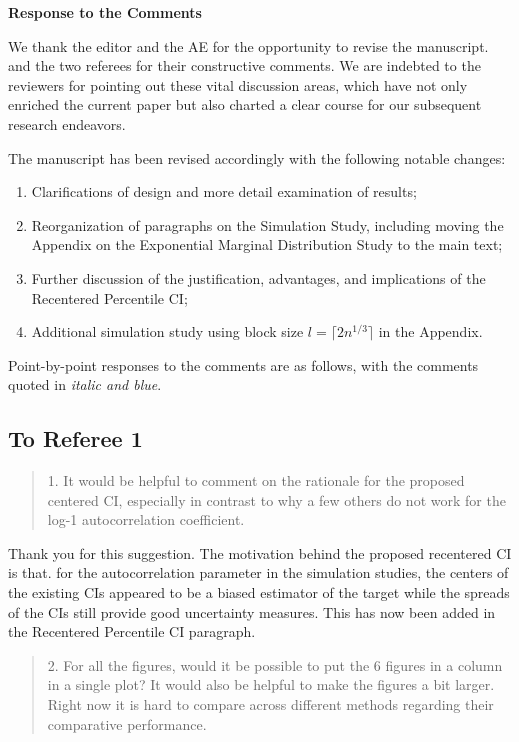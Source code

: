 \documentclass[12pt]{article}
\newenvironment{comment}%
{\begin{quotation}\noindent\small\it\color{darkblue}\ignorespaces%
}{\end{quotation}}
\begin{document}
\begin{center}
  {\Large\bf Response to the Comments}
\end{center}



We thank the editor and the AE for the opportunity to revise the manuscript. and
the two referees for their constructive comments.
We are indebted to the reviewers for pointing out these vital discussion areas,
which have not only enriched the current paper but also charted a clear course
for our subsequent research endeavors.

The manuscript has been
revised accordingly with the following notable changes:
\begin{enumerate}
\item Clarifications of design and more detail examination of results;
\item Reorganization of paragraphs on the Simulation Study, including moving the
Appendix on the Exponential Marginal Distribution Study to the main text;
\item Further discussion of the justification, advantages, and implications of
the Recentered Percentile CI;
\item Additional simulation study using block size 
$l = \lceil 2n^{1/3} \rceil$ in the Appendix.
\end{enumerate}


Point-by-point responses to the comments are as follows, with the
comments quoted in \emph{\color{darkblue} italic and blue}.

\subsection*{To Referee 1}

\begin{comment}
1. It would be helpful to comment on the rationale for the proposed centered CI, 
especially in contrast to why a few others do not work for the log-1 
autocorrelation coefficient.
\end{comment}


Thank you for this suggestion. The motivation behind the proposed
recentered CI is that. for the autocorrelation parameter in the
simulation studies, the centers of the existing CIs appeared to be a
biased estimator of the target while the spreads of the CIs still
provide good uncertainty measures. This has now been added in the
Recentered Percentile CI paragraph.


\begin{comment}
2. For all the figures, would it be possible to put the 6 figures in a column in 
a single plot? It would also be helpful to make the figures a bit larger. Right 
now it is hard to compare across different methods regarding their comparative 
performance.
\end{comment}
\end{document}
